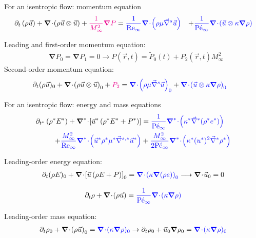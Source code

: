 \documentclass[xcolor=dvipsnames,10pt]{beamer}
\renewcommand{\Re}{\textrm{Re}}
\newcommand{\Pe}{\textrm{P\'e}}
\renewcommand{\div}{\boldsymbol{\nabla}\! \cdot \!}
\newcommand{\grad}{\boldsymbol{\nabla}}
\newcommand{\divv}[1]{\boldsymbol{\nabla}^{#1}\! \cdot \!}
\newcommand{\gradd}[1]{\vec{\nabla}^{#1}}
\begin{document}
\begin{frame}{For an isentropic flow: momentum equation}
\begin{align}
\partial_{t} \left( \rho \vec{u} \right) 
+ \div \left( \rho \vec{u}\otimes \vec{u} \right) 
+ \textcolor{magenta}{\frac{1}{M_\infty^2}\grad  P}
&= 
\textcolor{blue}{\frac{1}{\Re_\infty} \div \left( \rho \mu \gradd{s} \vec{u} \right)}
&+
\textcolor{blue}{\frac{1}{\Pe_\infty} \div \left(\vec{u}\otimes \kappa \grad  \rho \right)} \nonumber
\end{align}
\begin{block}{}
Leading and first-order momentum equation:
\begin{align}
&\grad P_0 = \grad P_1 = 0 \longrightarrow P(\vec{r}, t) = \tilde{P}_0(t) + P_2(\vec{r}, t) M_\infty^2\nonumber 
\end{align}
Second-order momentum equation:
\begin{align}
&\partial_t (\rho \vec{u} )_0 + \div \left( \rho \vec{u}\otimes \vec{u} \right)_0 + \textcolor{magenta}{P_2} = \textcolor{blue}{ \div \left( \rho \mu \gradd{s} \vec{u} \right)_0}
+
\textcolor{blue}{ \div \left(\vec{u}\otimes \kappa \grad  \rho \right)_0} \nonumber
\end{align}
\end{block}
\end{frame}
\begin{frame}{For an isentropic flow: energy and mass equations}
\begin{align}
\partial_{t^*} \left( \rho^* E^* \right) 
+ \divv{*}  \left[ \vec{u}^* \left( \rho^* E^* + P^* \right) \right] 
&=
\textcolor{blue}{\frac{1}{\Pe_\infty} \divv{*}  \left( \kappa^*  \gradd{*} (\rho^* e^*) \right)} \nonumber \\
+
\textcolor{blue}{\frac{M_\infty^2}{\Re_\infty} \divv{*}  \left( \vec{u}^* \rho^* \mu^* \gradd{s,*} \vec{u}^* \right)}
&+ 
\textcolor{blue}{\frac{M_\infty^2}{2 \Pe_\infty} \divv{*}  \left(\kappa^* (u^*)^2 \gradd{*} \rho^* \right)} \nonumber
\end{align}
\begin{block}{}
Leading-order energy equation:
\begin{align}
\partial_t ( \rho E )_0 + \div \left[ \vec{u} \left( \rho E + P \right) \right]_0 = \textcolor{blue}{\div \left( \kappa  \grad (\rho e) \right)_0} \longrightarrow \div \vec{u}_0 = 0 \nonumber 
\end{align}
\end{block}
\begin{align}
\partial_{t} \rho+ \div  \left(  \rho \vec{u}  \right) = \textcolor{blue}{\frac{1}{\Pe_\infty} \div  ( \kappa \grad \rho )} \nonumber
\end{align}
\begin{block}{}
Leading-order mass equation:
\begin{align}
\partial_{t} \rho_0+ \div  \left(  \rho \vec{u}  \right)_0 = \textcolor{blue}{ \div ( \kappa \grad \rho )_0} \to \partial_t \rho_0 + \vec{u}_0 \grad \rho_0 = \textcolor{blue}{ \div ( \kappa \grad \rho )_0}\nonumber
\end{align}
\end{block}
\end{frame}
\end{document}
